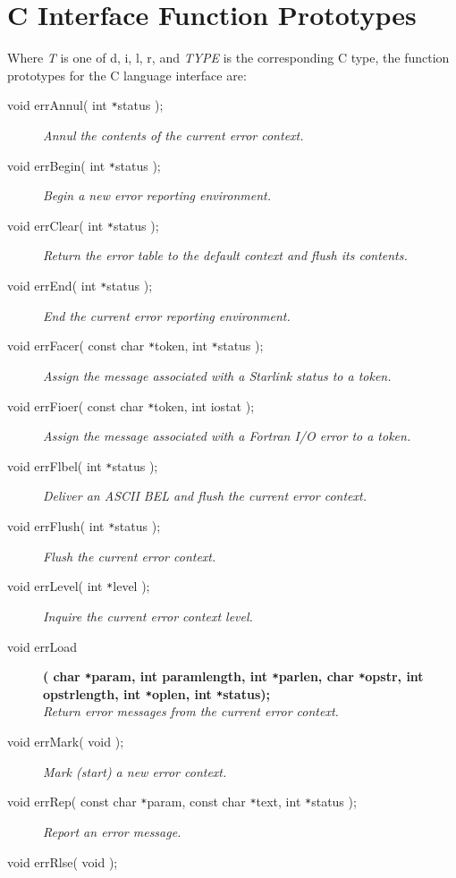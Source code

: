 \documentclass[twoside,11pt]{article}
\newcommand{\xlabel}[1]{}
\renewcommand{\_}{\texttt{\symbol{95}}}
\newcommand{\listline}{\hspace{1pt}\\}
\renewcommand{\listline}{}
\begin{document}
\section{\xlabel{c_interface_function_prototypes}C Interface Function Prototypes} \label{C_sect}
Where \textit{T} is one of d, i, l, r, and \textit{TYPE} is the corresponding C
type, the function prototypes for the C language interface are:
\begin{description}
\item[void errAnnul( int \texttt{*}status );] \listline
\textit{Annul the contents of the current error context.}
\item[void errBegin( int \texttt{*}status );] \listline
\textit{Begin a new error reporting environment.}
\item[void errClear( int \texttt{*}status );] \listline
\textit{Return the error table to the default context and flush its contents.}
\item[void errEnd( int \texttt{*}status );] \listline
\textit{End the current error reporting environment.}
\item[void errFacer( const char \texttt{*}token, int \texttt{*}status );] \listline
\textit{Assign the message associated with a Starlink status to a token.}
\item[void errFioer( const char \texttt{*}token, int iostat );] \listline
\textit{Assign the message associated with a Fortran I/O error to a token.}
\item[void errFlbel( int \texttt{*}status );] \listline
\textit{Deliver an ASCII BEL and flush the current error context.}
\item[void errFlush( int \texttt{*}status );] \listline
\textit{Flush the current error context.}
\item[void errLevel( int \texttt{*}level );] \listline
\textit{Inquire the current error context level.}
\item[void errLoad] \listline
\textbf{( char \texttt{*}param, int param\_length, int
\texttt{*}parlen,  {\listline}
char \texttt{*}opstr, int opstr\_length, int \texttt{*}oplen,
int \texttt{*}status);} \\
\textit{Return error messages from the current error context.}
\item[void errMark( void );] \listline
\textit{Mark (start) a new error context.}
\item[void errRep( const char \texttt{*}param, const char \texttt{*}text, 
int \texttt{*}status );] \listline
\textit{Report an error message.}
\item[void errRlse( void );] \listline

\end{description}
\end{document}
